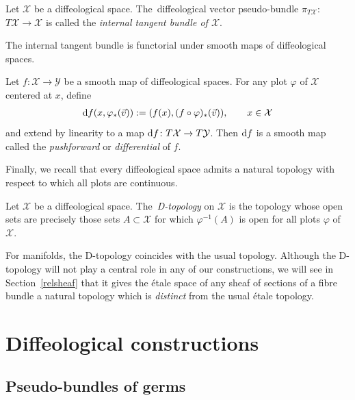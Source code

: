 \documentclass[10pt,a4paper]{amsart}
\numberwithin{equation}{section}
\def\YY{{\mathcal{Y}}}
\def\XX{{\mathcal{X}}}
\begin{document}
\begin{Definition}
Let $\XX$ be a diffeological space. The~diffeological vector pseudo-bundle $\pi_{T\XX}$: $T\XX\rightarrow \XX$ is called the \textit{internal tangent bundle of $\XX$}.
\end{Definition}

The internal tangent bundle is functorial under smooth maps of diffeological spaces.

\begin{Definition}\label{differential}
Let $f\colon \XX\rightarrow \YY$ be a smooth map of diffeological spaces. For any plot $\varphi$ of $\XX$ centered at $x$, define
\begin{gather*}
{\rm d}f(x,\varphi_{*}(\vec{v})):=(f(x),(f\circ\varphi)_{*}(\vec{v})),\qquad x\in \XX
\end{gather*}
and extend by linearity to a map ${\rm d}f\colon T\XX\rightarrow T\YY$. Then ${\rm d}f$ is a smooth map~\cite[Proposition~4.8]{cw} called the \textit{pushforward} or \textit{differential} of $f$.
\end{Definition}

Finally, we recall that every diffeological space admits a natural topology with respect to which all plots are continuous.

\begin{Definition}\label{Dtop}
Let $\XX$ be a diffeological space. The~\textit{D-topology} on $\XX$ is the topology whose open sets are precisely those sets $A\subset \XX$ for which $\varphi^{-1}(A)$ is open for all plots $\varphi$ of $\XX$.
\end{Definition}

For manifolds, the D-topology coincides with the usual topology. Although the D-topology will not play a central role in any of our constructions, we will see in Section~\ref{relsheaf} that it gives the \'{e}tale space of any sheaf of sections of a fibre bundle a natural topology which is \textit{distinct} from the usual \'{e}tale topology.

\section{Diffeological constructions}\label{sec3}

\subsection{Pseudo-bundles of germs}\label{pseudobundlesofgerms}
\end{document}
